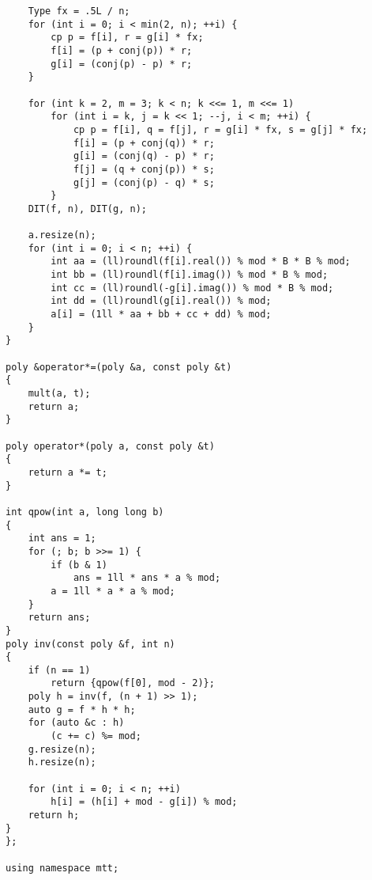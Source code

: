 \documentclass[twocolumn,a4]{article}
\begin{document}
\begin{lstlisting}
    Type fx = .5L / n;
    for (int i = 0; i < min(2, n); ++i) {
        cp p = f[i], r = g[i] * fx;
        f[i] = (p + conj(p)) * r;
        g[i] = (conj(p) - p) * r;
    }

    for (int k = 2, m = 3; k < n; k <<= 1, m <<= 1)
        for (int i = k, j = k << 1; --j, i < m; ++i) {
            cp p = f[i], q = f[j], r = g[i] * fx, s = g[j] * fx;
            f[i] = (p + conj(q)) * r;
            g[i] = (conj(q) - p) * r;
            f[j] = (q + conj(p)) * s;
            g[j] = (conj(p) - q) * s;
        }
    DIT(f, n), DIT(g, n);

    a.resize(n);
    for (int i = 0; i < n; ++i) {
        int aa = (ll)roundl(f[i].real()) % mod * B * B % mod;
        int bb = (ll)roundl(f[i].imag()) % mod * B % mod;
        int cc = (ll)roundl(-g[i].imag()) % mod * B % mod;
        int dd = (ll)roundl(g[i].real()) % mod;
        a[i] = (1ll * aa + bb + cc + dd) % mod;
    }
}

poly &operator*=(poly &a, const poly &t)
{
    mult(a, t);
    return a;
}

poly operator*(poly a, const poly &t)
{
    return a *= t;
}

int qpow(int a, long long b)
{
    int ans = 1;
    for (; b; b >>= 1) {
        if (b & 1)
            ans = 1ll * ans * a % mod;
        a = 1ll * a * a % mod;
    }
    return ans;
}
poly inv(const poly &f, int n)
{
    if (n == 1)
        return {qpow(f[0], mod - 2)};
    poly h = inv(f, (n + 1) >> 1);
    auto g = f * h * h;
    for (auto &c : h)
        (c += c) %= mod;
    g.resize(n);
    h.resize(n);

    for (int i = 0; i < n; ++i)
        h[i] = (h[i] + mod - g[i]) % mod;
    return h;
}
};

using namespace mtt;
\end{lstlisting}
\end{document}
